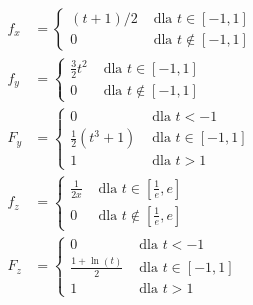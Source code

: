 \documentclass{article}
\begin{document}
\begin{align}
    f_x &= \begin{cases}
        (t+1)/2 &\text{ dla } t \in[-1,1]\\
        0 &\text{ dla } t \notin[-1,1]
    \end{cases}\\
    f_y &= \begin{cases}
        \frac{3}{2}t^2 &\text{ dla } t \in[-1,1]\\
        0 &\text{ dla } t \notin[-1,1]
    \end{cases}\\
    F_y &= \begin{cases}
        0 &\text{ dla } t < -1\\
        \frac{1}{2}(t^3+1) &\text{ dla } t \in[-1,1]\\
        1 &\text{ dla } t > 1
    \end{cases}\\
    f_z &= \begin{cases}
        \frac{1}{2x} &\text{ dla } t\in[\frac{1}{e},e]\\
        0 &\text{ dla } t\notin[\frac{1}{e},e]
    \end{cases}\\
    F_z &= \begin{cases}
        0 &\text{ dla } t < -1\\
        \frac{1+\ln(t)}{2} &\text{ dla } t \in[-1,1]\\
        1 &\text{ dla } t > 1
    \end{cases}
\end{align}
\end{document}
